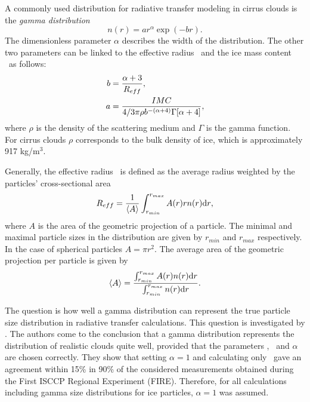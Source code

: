 A commonly used distribution for radiative transfer modeling in cirrus
clouds is the \emph{gamma distribution}
\begin{equation}
  n(r) = a  r^\alpha \exp(-br).
\label{eq:gamma_distr}
\end{equation}
The dimensionless parameter $\alpha$ describes the width of the
distribution. The other two parameters can be linked to the effective
radius \Reff\ and the ice mass content \imc\ as follows:
\begin{eqnarray}
  b &= \frac{\alpha+3}{R_{eff}},\\
  a &= \frac{IMC}{4/3\pi\rho b^{-(\alpha+4)}\Gamma[\alpha+4]},
\label{eq:gamma_coeff}
\end{eqnarray}
where $\rho$ is the density of the scattering medium and $\Gamma$ is
the gamma function. For cirrus clouds $\rho$ corresponds to the bulk
density of ice, which is approximately 917 kg/m$^3$.

Generally, the effective radius \Reff\ is defined as the average
radius weighted by the particles' cross-sectional area
\begin{equation}
  \label{eq:Reff}
  R_{eff}= \frac{1}{\left\langle A \right\rangle} \int_{r_{min}}^{r_{max}} {A(r) r n(r) \mathrm{d} r},
\end{equation}
where $A$ is the area of the geometric projection of a particle. The
minimal and maximal particle sizes in the distribution are given by
$r_{min}$ and $r_{max}$ respectively. In the case of spherical
particles $A = \pi r^2$. The average area of the geometric projection
per particle  is given by
\begin{equation}
  \left\langle A \right\rangle = \frac{\int_{r_{min}}^{r_{max}} {A(r) n(r) \mathrm{d} r}}{\int_{r_{min}}^{r_{max}} {n(r) \mathrm{d} r}}.
\end{equation}

The question is how well a gamma distribution can represent the true
particle size distribution in radiative transfer calculations. This
question is investigated by \citet{evans:98}. The authors come to the
conclusion that a gamma distribution represents the distribution of
realistic clouds quite well, provided that the parameters \Reff, \imc\ 
and $\alpha$ are chosen correctly. They show that setting $\alpha = 1$
and calculating only \Reff\ gave an agreement within 15\% in 90\% of
the considered measurements obtained during the First ISCCP Regional
Experiment (FIRE).  Therefore, for all calculations including gamma
size distributions for ice particles, $\alpha = 1$ was assumed.  

